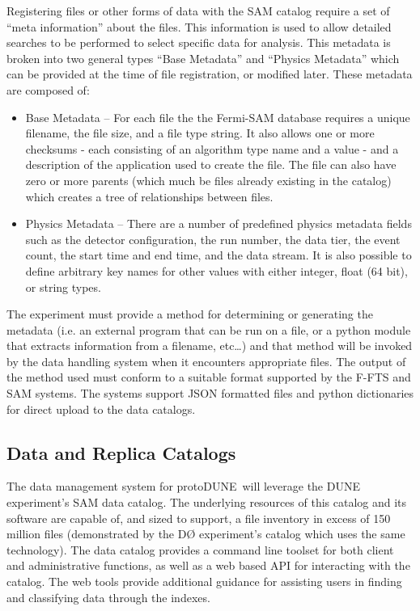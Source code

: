 \documentclass[pdftex,12pt,letter]{article}
\newcommand{\pd}{protoDUNE\ }
\begin{document}
Registering files or other forms of data with the SAM catalog require a set of “meta information” about the files.  This information is used to allow detailed searches to be performed to select specific data for analysis.  This metadata is broken into two general types “Base Metadata” and “Physics Metadata” which can be provided at the time of file registration, or modified later.  These metadata are composed of:
\begin{itemize}
\item Base Metadata -- For each file the the Fermi-SAM database requires a unique filename, the file size, and a file type string. It also allows one or more checksums - each consisting of an algorithm type name and a value - and a description of the application used to create the file. The file can also have zero or more parents (which much be files already existing in the catalog) which creates a tree of relationships between files.
\item Physics Metadata -- There are a number of predefined physics metadata fields such as the detector configuration, the run number, the data tier, the event count, the start time and end time, and the data stream. It is also possible to define arbitrary key names for other values with either integer, float (64 bit), or string types.
\end{itemize}

The experiment must provide a method for determining or generating the metadata (i.e. an external program that can be run on a file, or a python module that extracts information from a filename, etc…)  and that method will be invoked by the data handling system when it encounters appropriate files.  The output of the method used must conform to a suitable format supported by the F-FTS and SAM systems.  The systems support JSON formatted files and python dictionaries for direct upload to the data catalogs.  

\subsection{Data and Replica Catalogs}

The data management system for \pd will leverage the DUNE experiment’s SAM data catalog.  The underlying resources of this catalog and its software are capable of, and sized to support, a file inventory in excess of 150 million files (demonstrated by the DØ experiment’s catalog which uses the same technology).  The data catalog provides a command line toolset for both client and administrative functions, as well as a web based API for interacting with the catalog.  The web tools provide additional guidance for assisting users in finding and classifying data through the indexes.
\end{document}
